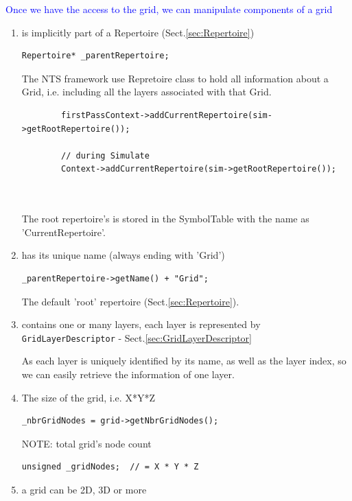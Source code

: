 \textcolor{blue}{Once we have the access to the grid, we can manipulate components of a grid}
\begin{enumerate}
   \item is implicitly part of a Repertoire (Sect.\ref{sec:Repertoire})
  
\begin{verbatim}
Repertoire* _parentRepertoire;
\end{verbatim}

The NTS framework use Repretoire class to hold all information about a Grid,
i.e. including all the layers associated with that Grid.

\begin{verbatim}
		firstPassContext->addCurrentRepertoire(sim->getRootRepertoire());
		
		// during Simulate
		Context->addCurrentRepertoire(sim->getRootRepertoire());
		
		
\end{verbatim}
The root repertoire's is stored in the SymbolTable with the name as 'CurrentRepertoire'.

  
  \item has its unique name (always ending with 'Grid')

\begin{verbatim}
_parentRepertoire->getName() + "Grid"; 
\end{verbatim}
  
The default 'root' repertoire (Sect.\ref{sec:Repertoire}).  

    \item contains one or many layers, each layer is represented by \verb!GridLayerDescriptor! -
  Sect.\ref{sec:GridLayerDescriptor}
  
  As each layer is uniquely identified by its name, as well as the layer index, so we can easily
  retrieve the information of one layer.


  \item The size of the grid, i.e. X*Y*Z
  
\begin{verbatim}
_nbrGridNodes = grid->getNbrGridNodes();
\end{verbatim}

NOTE: total grid's node count
  
\begin{verbatim}
unsigned _gridNodes;  // = X * Y * Z
\end{verbatim}

  
  \item a grid can be 2D, 3D or more
  

\end{enumerate}
